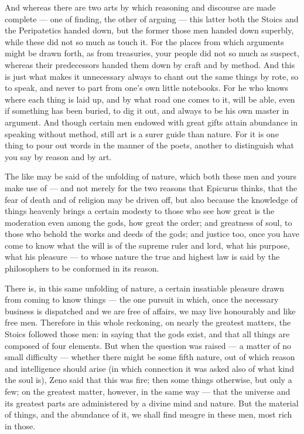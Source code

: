  And whereas there are two arts by which reasoning and discourse are made complete — one of finding, the other of arguing — this latter both the Stoics and the Peripatetics handed down, but the former those men handed down superbly, while these did not so much as touch it. For the places from which arguments might be drawn forth, as from treasuries, your people did not so much as suspect, whereas their predecessors handed them down by craft and by method. And this is just what makes it unnecessary always to chant out the same things by rote, so to speak, and never to part from one's own little notebooks. For he who knows where each thing is laid up, and by what road one comes to it, will be able, even if something has been buried, to dig it out, and always to be his own master in argument. And though certain men endowed with great gifts attain abundance in speaking without method, still art is a surer guide than nature. For it is one thing to pour out words in the manner of the poets, another to distinguish what you say by reason and by art.

 The like may be said of the unfolding of nature, which both these men and yours make use of — and not merely for the two reasons that Epicurus thinks, that the fear of death and of religion may be driven off, but also because the knowledge of things heavenly brings a certain modesty to those who see how great is the moderation even among the gods, how great the order; and greatness of soul, to those who behold the works and deeds of the gods; and justice too, once you have come to know what the will is of the supreme ruler and lord, what his purpose, what his pleasure — to whose nature the true and highest law is said by the philosophers to be conformed in its reason.

 There is, in this same unfolding of nature, a certain insatiable pleasure drawn from coming to know things — the one pursuit in which, once the necessary business is dispatched and we are free of affairs, we may live honourably and like free men. Therefore in this whole reckoning, on nearly the greatest matters, the Stoics followed those men: in saying that the gods exist, and that all things are composed of four elements. But when the question was raised — a matter of no small difficulty — whether there might be some fifth nature, out of which reason and intelligence should arise (in which connection it was asked also of what kind the soul is), Zeno said that this was fire; then some things otherwise, but only a few; on the greatest matter, however, in the same way — that the universe and its greatest parts are administered by a divine mind and nature. But the material of things, and the abundance of it, we shall find meagre in these men, most rich in those.

